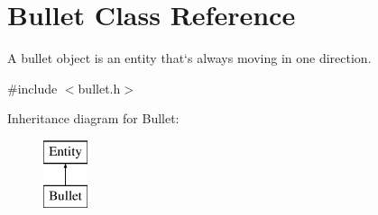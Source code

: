 \hypertarget{class_bullet}{}\section{Bullet Class Reference}
\label{class_bullet}


A bullet object is an entity that`s always moving in one direction.  




{\ttfamily \#include $<$bullet.\+h$>$}

Inheritance diagram for Bullet\+:\begin{figure}[H]
\begin{center}
\leavevmode
\includegraphics[height=2.000000cm]{class_bullet}
\end{center}
\end{figure}
